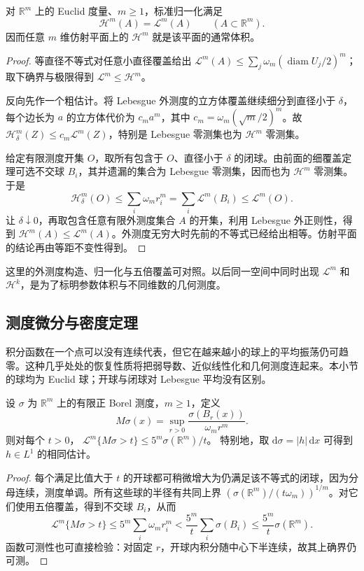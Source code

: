 \begin{theorem}\label{g3:thm:hausdorff-lebesgue}
	对 \(\mathbb R^m\) 上的 Euclid 度量、\(m\ge1\)，标准归一化满足
	\[
		\mathcal H^m(A)=\mathcal L^m(A)\qquad(A\subset\mathbb R^m).
	\]
	因而任意 \(m\) 维仿射平面上的 \(\mathcal H^m\) 就是该平面的通常体积。
\end{theorem}
\begin{proof}
	等直径不等式对任意小直径覆盖给出
	\(\mathcal L^m(A)\le\sum_j\omega_m(\operatorname{diam}U_j/2)^m\)；取下确界与极限得到 \(\mathcal L^m\le\mathcal H^m\)。

	反向先作一个粗估计。将 Lebesgue 外测度的立方体覆盖继续细分到直径小于 \(\delta\)，每个边长为 \(a\) 的立方体代价为
	\(c_m a^m\)，其中 \(c_m=\omega_m(\sqrt m/2)^m\)。故
	\(\mathcal H^m_\delta(Z)\le c_m\mathcal L^m(Z)\)，特别是 Lebesgue 零测集也为 \(\mathcal H^m\) 零测集。

	给定有限测度开集 \(O\)，取所有包含于 \(O\)、直径小于 \(\delta\) 的闭球。由前面的细覆盖定理可选不交球 \(B_i\)，其并遗漏的集合为 Lebesgue 零测集，因而也为 \(\mathcal H^m\) 零测集。于是
	\[
		\mathcal H^m_\delta(O)
		\le\sum_i\omega_m r_i^m
		=\sum_i\mathcal L^m(B_i)\le\mathcal L^m(O).
	\]
	让 \(\delta\downarrow0\)，再取包含任意有限外测度集合 \(A\) 的开集，利用 Lebesgue 外正则性，得到 \(\mathcal H^m(A)\le\mathcal L^m(A)\)。外测度无穷大时先前的不等式已经给出相等。仿射平面的结论再由等距不变性得到。
\end{proof}

这里的外测度构造、归一化与五倍覆盖可对照\cite[第2--3节，第6--16页]{Simon1983}。以后同一空间中同时出现 \(\mathcal L^m\) 和 \(\mathcal H^k\)，是为了标明参数体积与不同维数的几何测度。

\subsection{测度微分与密度定理}
\label{g3:subsec:2001:03}
积分函数在一个点可以没有连续代表，但它在越来越小的球上的平均振荡仍可趋零。这种几乎处处的恢复性质将把弱导数、近似线性化和几何测度连起来。本小节的球均为 Euclid 球；开球与闭球对 Lebesgue 平均没有区别。

\begin{lemma}\label{g3:lem:measure-maximal-weak-bound}
	设 \(\sigma\) 为 \(\mathbb R^m\) 上的有限正 Borel 测度，\(m\ge1\)，定义
	\[
		M\sigma(x)=\sup_{r>0}\frac{\sigma(B_r(x))}{\omega_mr^m}.
	\]
	则对每个 \(t>0\)，
	\(\mathcal L^m\{M\sigma>t\}\le5^m\sigma(\mathbb R^m)/t\)。
	特别地，取 \(\mathrm d\sigma=|h|\,\mathrm dx\) 可得到 \(h\in L^1\) 的相同估计。
\end{lemma}
\begin{proof}
	每个满足比值大于 \(t\) 的开球都可稍微增大为仍满足该不等式的闭球，因为分母连续，测度单调。所有这些球的半径有共同上界
	\((\sigma(\mathbb R^m)/(t\omega_m))^{1/m}\)。对它们使用五倍覆盖，得到不交球 \(B_i\)，从而
	\[
		\mathcal L^m\{M\sigma>t\}
		\le5^m\sum_i\omega_mr_i^m
		<\frac{5^m}{t}\sum_i\sigma(B_i)
		\le\frac{5^m}{t}\sigma(\mathbb R^m).
	\]
	函数可测性也可直接检验：对固定 \(r\)，开球内积分随中心下半连续，故其上确界仍可测。
\end{proof}

